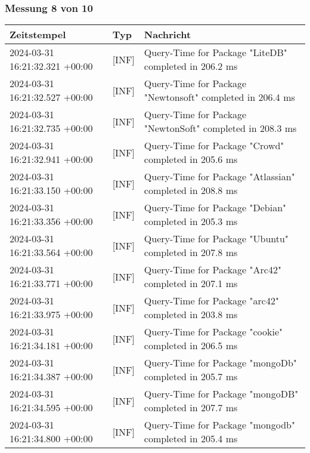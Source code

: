     \subsubsection*{Messung 8 von 10} \label{subsubsec:MySQLOhneIndex8von10}
        {
            {\small
                \begin{tabularx}{\textwidth}{|l|l|X|}
                    \hline
                    \textbf{Zeitstempel} & \textbf{Typ} & \textbf{Nachricht} \\
                    \hline
                    \endhead
                    2024-03-31 16:21:32.321 +00:00 & [INF] & Query-Time for Package "LiteDB" completed in 206.2 ms \\
                    2024-03-31 16:21:32.527 +00:00 & [INF] & Query-Time for Package "Newtonsoft" completed in 206.4 ms \\
                    2024-03-31 16:21:32.735 +00:00 & [INF] & Query-Time for Package "NewtonSoft" completed in 208.3 ms \\
                    2024-03-31 16:21:32.941 +00:00 & [INF] & Query-Time for Package "Crowd" completed in 205.6 ms \\
                    2024-03-31 16:21:33.150 +00:00 & [INF] & Query-Time for Package "Atlassian" completed in 208.8 ms \\
                    2024-03-31 16:21:33.356 +00:00 & [INF] & Query-Time for Package "Debian" completed in 205.3 ms \\
                    2024-03-31 16:21:33.564 +00:00 & [INF] & Query-Time for Package "Ubuntu" completed in 207.8 ms \\
                    2024-03-31 16:21:33.771 +00:00 & [INF] & Query-Time for Package "Arc42" completed in 207.1 ms \\
                    2024-03-31 16:21:33.975 +00:00 & [INF] & Query-Time for Package "arc42" completed in 203.8 ms \\
                    2024-03-31 16:21:34.181 +00:00 & [INF] & Query-Time for Package "cookie" completed in 206.5 ms \\
                    2024-03-31 16:21:34.387 +00:00 & [INF] & Query-Time for Package "mongoDb" completed in 205.7 ms \\
                    2024-03-31 16:21:34.595 +00:00 & [INF] & Query-Time for Package "mongoDB" completed in 207.7 ms \\
                    2024-03-31 16:21:34.800 +00:00 & [INF] & Query-Time for Package "mongodb" completed in 205.4 ms \\

\end{tabularx}}}
